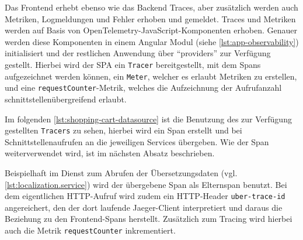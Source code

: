 Das Frontend erhebt ebenso wie das Backend Traces, aber zusätzlich werden auch Metriken, Logmeldungen und Fehler erhoben und gemeldet. Traces und Metriken werden auf Basis von OpenTelemetry-JavaScript-Komponenten \cite{OpenTelemetryJS} erhoben. Genauer werden diese Komponenten in einem Angular Modul (siehe \autoref{lst:app-observability}) initialisiert und der restlichen Anwendung über \enquote{providers} zur Verfügung gestellt. Hierbei wird der SPA ein \texttt{Tracer} bereitgestellt, mit dem Spans aufgezeichnet werden können, ein \texttt{Meter}, welcher es erlaubt Metriken zu erstellen, und eine \texttt{requestCounter}-Metrik, welches die Aufzeichnung der Aufrufanzahl schnittstellenübergreifend erlaubt.



Im folgenden \autoref{lst:shopping-cart-datasource} ist die Benutzung des zur Verfügung gestellten \texttt{Tracers} zu sehen, hierbei wird ein Span erstellt und bei Schnittstellenaufrufen an die jeweiligen Services übergeben. Wie der Span weiterverwendet wird, ist im nächsten Absatz beschrieben.



Beispielhaft im Dienst zum Abrufen der Übersetzungsdaten (vgl. \autoref{lst:localization.service}) wird der übergebene Span als Elternspan benutzt. Bei dem eigentlichen HTTP-Aufruf wird zudem ein HTTP-Header \texttt{uber-trace-id} angereichert, den der dort laufende Jaeger-Client interpretiert \cite{JaegerClient} und daraus die Beziehung zu den Frontend-Spans herstellt. Zusätzlich zum Tracing wird hierbei auch die Metrik \texttt{requestCounter} inkrementiert.



